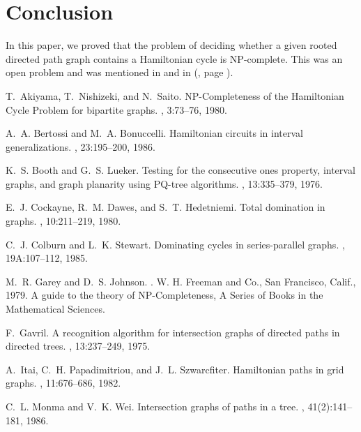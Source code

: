 \documentclass[a4paper,12pt]{article}
\theoremstyle{plain}
\theoremstyle{definition}
\theoremstyle{remark}
\begin{document}
\section{Conclusion} In this paper, we proved that the problem of
deciding whether a given rooted directed path graph  contains a
Hamiltonian cycle is NP-complete. This was an open problem and was
mentioned in \cite{giri} and in (\cite {spinrad}, page ).


 
\begin{thebibliography}{10}

T.~Akiyama, T.~Nishizeki, and N.~Saito.
\newblock N{P}-{C}ompleteness of the {H}amiltonian {C}ycle {P}roblem for
  bipartite graphs.
, 3:73--76, 1980.

A.~A. Bertossi and M.~A. Bonuccelli.
\newblock Hamiltonian circuits in interval generalizations.
, 23:195--200, 1986.

K.~S. Booth and G.~S. Lueker.
\newblock Testing for the consecutive ones property, interval graphs, and graph
  planarity using {PQ}-tree algorithms.
, 13:335--379, 1976.

E.~J. Cockayne, R.~M. Dawes, and S.~T. Hedetniemi.
\newblock Total domination in graphs.
, 10:211--219, 1980.

C.~J. Colburn and L.~K. Stewart.
\newblock Dominating cycles in series-parallel graphs.
, 19A:107--112, 1985.

M.~R. Garey and D.~S. Johnson.
.
\newblock W. H. Freeman and Co., San Francisco, Calif., 1979.
\newblock A guide to the theory of NP-{C}ompleteness, A Series of Books in the
  Mathematical Sciences.

F.~Gavril.
\newblock A recognition algorithm for intersection graphs of directed paths in
  directed trees.
, 13:237--249, 1975.

A.~Itai, C.~H. Papadimitriou, and J.~L. Szwarcfiter.
\newblock Hamiltonian paths in grid graphs.
, 11:676--686, 1982.

C.~L. Monma and V.~K. Wei.
\newblock Intersection graphs of paths in a tree.
, 41(2):141--181, 1986.


\end{thebibliography}
\end{document}
